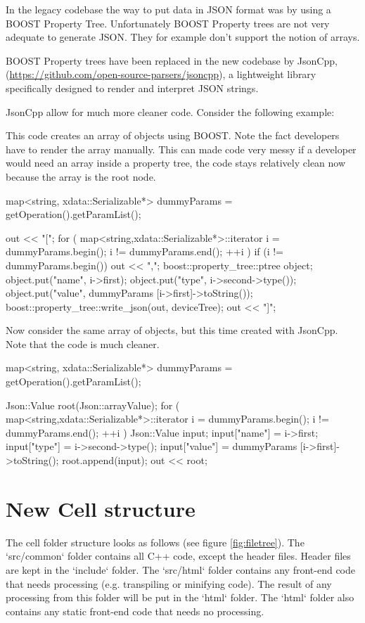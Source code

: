 In the legacy codebase the way to put data in JSON format was by using a
BOOST Property Tree.
Unfortunately BOOST Property trees are not very adequate to generate JSON. They
for example don't support the notion of arrays\cite{boost_propertytrees}.

BOOST Property trees have been replaced in the new codebase by JsonCpp,
(\url{https://github.com/open-source-parsers/jsoncpp}), a lightweight library
specifically designed to render and interpret JSON strings.

JsonCpp allow for much more cleaner code.
Consider the following example:

This code creates an array of objects using BOOST. Note the fact developers have to
render the array manually. This can made code very messy if a developer would need an
array inside a property tree, the code stays relatively clean now because the
array is the root node.
\begin{pyglist}[language=cpp,numbers=left,numbersep=5pt,fontsize=\small]
map<string, xdata::Serializable*> dummyParams = getOperation().getParamList();

out << "[";
for ( map<string,xdata::Serializable*>::iterator i = dummyParams.begin();
      i != dummyParams.end(); ++i ) {
  if (i != dummyParams.begin()) {
    out << ",";
  }
  boost::property_tree::ptree object;
  object.put("name", i->first);
  object.put("type", i->second->type());
  object.put("value", dummyParams [i->first]->toString());
  boost::property_tree::write_json(out, deviceTree);
}
out << "]";
\end{pyglist}

Now consider the same array of objects, but this time created with JsonCpp.
Note that the code is much cleaner.
\begin{pyglist}[language=cpp,numbers=left,numbersep=5pt,fontsize=\small]
map<string, xdata::Serializable*> dummyParams = getOperation().getParamList();

Json::Value root(Json::arrayValue);
for ( map<string,xdata::Serializable*>::iterator i = dummyParams.begin();
      i != dummyParams.end(); ++i ) {
  Json::Value input;
  input["name"] = i->first;
  input["type"] = i->second->type();
  input["value"] = dummyParams [i->first]->toString();
  root.append(input);
}
out << root;
\end{pyglist}

\section{New Cell structure}
The cell folder structure looks as follows (see figure \ref{fig:filetree}).
The `src/common` folder contains all C++ code, except the header files.
Header files are kept in the `include` folder.
The `src/html` folder contains any front-end code that needs processing (e.g.
transpiling or minifying code). The result of any processing from this
folder will be put in the `html` folder.
The `html` folder also contains any static front-end code that needs no processing.

